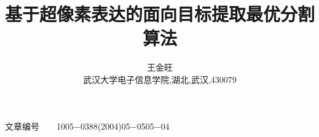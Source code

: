 \documentclass[a4paper,11pt,onecolumn,twoside]{article}
\title{\huge{\textbf{基于超像素表达的面向目标提取最优分割算法}}}
\author{王金旺\\[2pt]
\normalsize
武汉大学电子信息学院,湖北,武汉,430079 \\[2pt]}
\date{}  %
\begin{document}
\newcommand{\supercite}[1]{\textsuperscript{\cite{#1}}}

\maketitle



\begin{minipage}[c]{10cm}
\vspace{-35.5cm}
文章编号~~~~1005$-$0388(2004)05$-$0505$-$04
\end{minipage}
\setlength{\oddsidemargin}{-.5cm}  %
\setlength{\evensidemargin}{\oddsidemargin}
\setlength{\textwidth}{17.00cm}
\setlength{\parskip}{0pt}



\begin{multicols}{2}
















\end{multicols}


\end{document}
